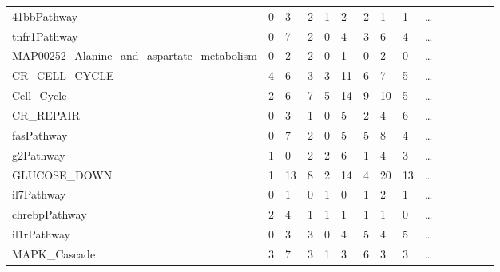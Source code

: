 \documentclass{scrartcl}
\numberwithin{figure}{section}
\numberwithin{table}{section}
\begin{document}
\begin{table}[h!]
\begin{tabular}{lllllllllllllll}
41bbPathway                                      & 0            & 3           & 2               & 1          & 2            & 2            & 1            & 1 & \dots \\
tnfr1Pathway                                     & 0            & 7           & 2               & 0          & 4            & 3            & 6            & 4 & \dots \\
MAP00252\_Alanine\_and\_aspartate\_metabolism    & 0            & 2           & 2               & 0          & 1            & 0            & 2            & 0 & \dots \\
CR\_CELL\_CYCLE                                  & 4            & 6           & 3               & 3          & 11           & 6            & 7            & 5 & \dots \\
Cell\_Cycle                                      & 2            & 6           & 7               & 5          & 14           & 9            & 10           & 5 & \dots \\
CR\_REPAIR                                       & 0            & 3           & 1               & 0          & 5            & 2            & 4            & 6 & \dots \\
fasPathway                                       & 0            & 7           & 2               & 0          & 5            & 5            & 8            & 4 & \dots \\
g2Pathway                                        & 1            & 0           & 2               & 2          & 6            & 1            & 4            & 3 & \dots \\
GLUCOSE\_DOWN                                    & 1            & 13          & 8               & 2          & 14           & 4            & 20           & 13& \dots \\
il7Pathway                                       & 0            & 1           & 0               & 1          & 0            & 1            & 2            & 1 & \dots \\
chrebpPathway                                    & 2            & 4           & 1               & 1          & 1            & 1            & 1            & 0 & \dots \\
il1rPathway                                      & 0            & 3           & 3               & 0          & 4            & 5            & 4            & 5 & \dots \\
MAPK\_Cascade                                    & 3            & 7           & 3               & 1          & 3            & 6            & 3            & 3 & \dots \\

\end{tabular}
\end{table}
\end{document}
